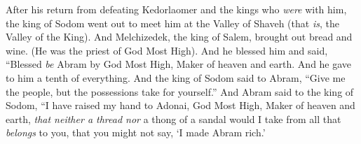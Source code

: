 \begin{biblechapter}
 After his return from defeating Kedorlaomer and the kings who \textit{were} with him, the king of Sodom went out to meet him at the Valley of Shaveh (that \textit{is}, the Valley of the King).
\verse And Melchizedek, the king of Salem, brought out bread and wine. (He was the priest of God Most High).
\verse And he blessed him and said,
\verse “Blessed \textit{be} Abram by God Most High, 
Maker of heaven and earth.
\verse And he gave to him a tenth of everything.
\verse And the king of Sodom said to Abram, “Give me the people, but the possessions take for yourself.”
\verse And Abram said to the king of Sodom, “I have raised my hand to Adonai, God Most High, Maker of heaven and earth,
\verse \textit{that neither a thread nor} a thong of a sandal would I take from all that \textit{belongs} to you, that you might not say, ‘I made Abram rich.’
\end{biblechapter}

